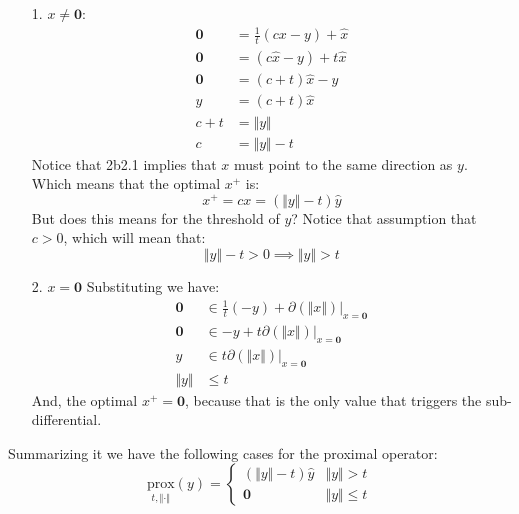 \documentclass[]{article}
\begin{document}
        \begin{enumerate}
        \item[1.] $x\neq \mathbf{0}$: 
            \begin{align*}\tag{2b2}\label{eqn:2b2}
                \mathbf{0} &= \frac{1}{t}(cx - y) + \widehat{x}
                \\
                \mathbf{0} &= (c \widehat{x} - y) + t \widehat{x}
                \\
                \mathbf{0} &= (c + t)\widehat{x} - y
                \\
                y & = (c + t)\widehat{x} \tag{2b2.1}
                \\
                c + t &= \Vert y\Vert
                \\
                c &= \Vert y\Vert - t
            \end{align*}
            Notice that 2b2.1 implies that $x$ must point to the same direction as $y$. 
            Which means that the optimal $x^+$ is: 
            $$
            x^+ = cx = (\Vert y\Vert - t)\widehat{y}
            $$
            But does this means for the threshold of $y$? Notice that assumption that $c > 0$, which will mean that: 
            $$
            \Vert y\Vert - t > 0 \implies \Vert y\Vert > t
            $$
        \item[2.] $x = \mathbf{0}$
            Substituting we have: 
            \begin{align*}\tag{2b3}\label{eqn:2b3}
                \mathbf{0} &\in \frac{1}{t}(-y) + \left.\partial(\Vert x\Vert)\right|_{x = \mathbf{0}}
                \\
                \mathbf{0} &\in -y +  t\left.\partial(\Vert x\Vert)\right|_{x = \mathbf{0}}
                \\
                y &\in t\left.\partial(\Vert x\Vert)\right|_{x = \mathbf{0}}
                \\
                \Vert y\Vert &\le t
            \end{align*}
            And, the optimal $x^+ = \mathbf{0}$, because that is the only value that triggers the sub-differential. 
        \end{enumerate}
        Summarizing it we have the following cases for the proximal operator: 
        $$
            \underset{t, \Vert \cdot\Vert}{\text{prox}}(y)
            = 
            \begin{cases}
                (\Vert y\Vert - t)\widehat{y} & \Vert y\Vert > t
                \\
                \mathbf{0} & \Vert y\Vert \le t
            \end{cases}
        $$
\end{document}

